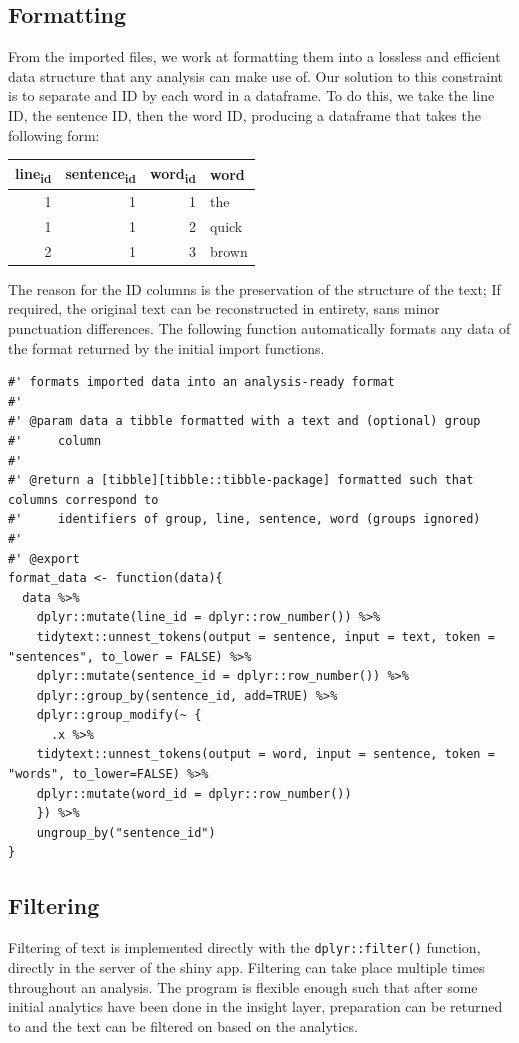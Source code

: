 \documentclass[11pt, a4paper, oneside]{report}
\begin{document}
\subsection{Formatting}
\label{sec:org9865b77}
From the imported files, we work at formatting them into a lossless
and efficient data structure that any analysis can make use of. Our
solution to this constraint is to separate and ID by each word in a
dataframe. To do this, we take the line ID, the sentence ID, then the
word ID, producing a dataframe that takes the following form:

\begin{center}
\begin{tabular}{rrrl}
line\textsubscript{id} & sentence\textsubscript{id} & word\textsubscript{id} & word\\
\hline
1 & 1 & 1 & the\\
1 & 1 & 2 & quick\\
2 & 1 & 3 & brown\\
\end{tabular}
\end{center}

The reason for the ID columns is the preservation of the structure of
the text; If required, the original text can be reconstructed in
entirety, sans minor punctuation differences. The following function
automatically formats any data of the format returned by the initial
import functions.

\begin{verbatim}
#' formats imported data into an analysis-ready format
#'
#' @param data a tibble formatted with a text and (optional) group
#'     column
#'
#' @return a [tibble][tibble::tibble-package] formatted such that columns correspond to
#'     identifiers of group, line, sentence, word (groups ignored)
#'
#' @export
format_data <- function(data){
  data %>%
    dplyr::mutate(line_id = dplyr::row_number()) %>% 
    tidytext::unnest_tokens(output = sentence, input = text, token = "sentences", to_lower = FALSE) %>%
    dplyr::mutate(sentence_id = dplyr::row_number()) %>%
    dplyr::group_by(sentence_id, add=TRUE) %>%
    dplyr::group_modify(~ {
      .x %>%
	tidytext::unnest_tokens(output = word, input = sentence, token = "words", to_lower=FALSE) %>%
	dplyr::mutate(word_id = dplyr::row_number())
    }) %>%
    ungroup_by("sentence_id")
}
\end{verbatim}
\subsection{Filtering}
\label{sec:orge4eec20}
Filtering of text is implemented directly with the
\texttt{dplyr::filter()} function, directly in the server of the shiny
app. Filtering can take place multiple times throughout an analysis.
The program is flexible enough such that after some initial analytics
have been done in the insight layer, preparation can be returned
to and the text can be filtered on based on the analytics.
\end{document}

